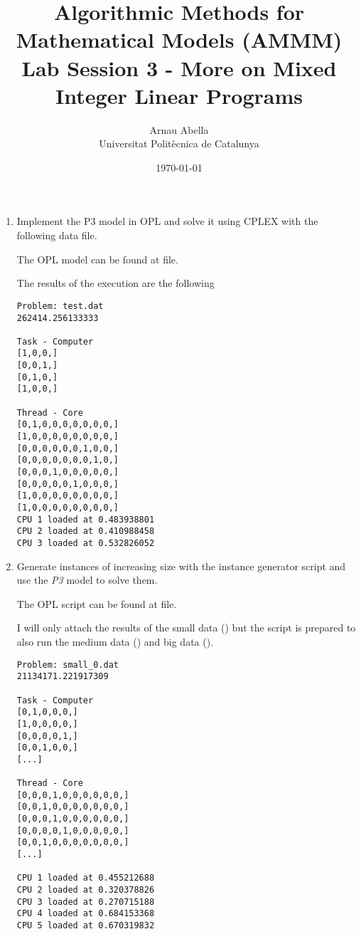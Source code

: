 \documentclass[12pt, a4paper]{article}
\title{%
  \vspace{-10ex}
  \Large{Algorithmic Methods for Mathematical Models (AMMM)} \\
  \large{Lab Session 3 - More on Mixed Integer Linear Programs}
}
\author{%
  Arnau Abella \\
  \large{Universitat Polit\`ecnica de Catalunya}
}
\date{\today}
\begin{document}
\maketitle

\vspace{10ex}
\begin{enumerate}[label=(\alph*)]
    \item Implement the P3 model in OPL and solve it using CPLEX with the following data file.

    The OPL model can be found at  file.

    The results of the execution are the following

    \begin{verbatim}
Problem: test.dat
262414.256133333

Task - Computer
[1,0,0,]
[0,0,1,]
[0,1,0,]
[1,0,0,]

Thread - Core
[0,1,0,0,0,0,0,0,0,]
[1,0,0,0,0,0,0,0,0,]
[0,0,0,0,0,0,1,0,0,]
[0,0,0,0,0,0,0,1,0,]
[0,0,0,1,0,0,0,0,0,]
[0,0,0,0,0,1,0,0,0,]
[1,0,0,0,0,0,0,0,0,]
[1,0,0,0,0,0,0,0,0,]
CPU 1 loaded at 0.483938801
CPU 2 loaded at 0.410988458
CPU 3 loaded at 0.532826052
    \end{verbatim}

    \newpage

    \item Generate instances of increasing size with the instance generator script and use the \textit{P3} model to solve them.

    The OPL script can be found at  file.

    I will only attach the results of the small data () but the script is prepared to also run the medium data () and big data ().

    \begin{verbatim}
Problem: small_0.dat
21134171.221917309

Task - Computer
[0,1,0,0,0,]
[1,0,0,0,0,]
[0,0,0,0,1,]
[0,0,1,0,0,]
[...]

Thread - Core
[0,0,0,1,0,0,0,0,0,0,]
[0,0,1,0,0,0,0,0,0,0,]
[0,0,0,1,0,0,0,0,0,0,]
[0,0,0,0,1,0,0,0,0,0,]
[0,0,1,0,0,0,0,0,0,0,]
[...]

CPU 1 loaded at 0.455212688
CPU 2 loaded at 0.320378826
CPU 3 loaded at 0.270715188
CPU 4 loaded at 0.684153368
CPU 5 loaded at 0.670319832
    \end{verbatim}


\end{enumerate}
\end{document}
